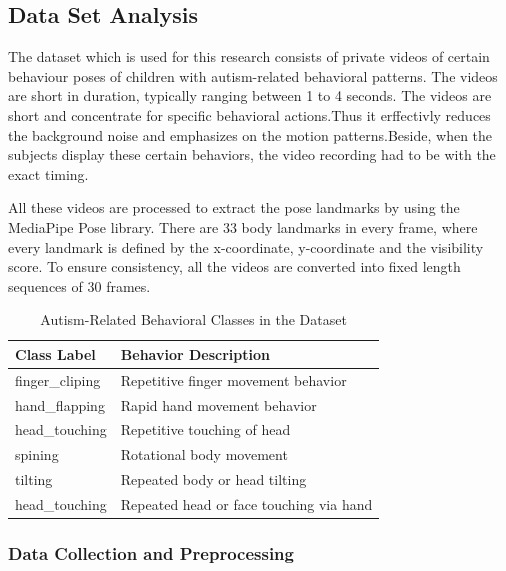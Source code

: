 \subsection{Data Set Analysis}

The dataset which is used for this research consists of private videos of certain behaviour poses of children with autism-related behavioral patterns. The videos are short in duration, typically ranging between 1 to 4 seconds. The videos are short and concentrate for specific behavioral actions.Thus it erffectivly reduces the background noise and emphasizes on the motion patterns.Beside, when the subjects display these certain behaviors, the video recording had to be with the exact timing.

All these videos are processed to extract the pose landmarks by using the MediaPipe Pose library. There are 33 body landmarks in every frame, where every landmark is defined by the x-coordinate, y-coordinate and the visibility score. To ensure consistency, all the videos are converted into fixed length sequences of 30 frames.

\begin{table}[htbp]
\caption{Autism-Related Behavioral Classes in the Dataset}
\begin{center}
\begin{tabularx}{0.6\textwidth}{
| >{\centering\arraybackslash}X
| >{\centering\arraybackslash}X | }
\hline
\textbf{Class Label} & \textbf{Behavior Description} \\
\hline
finger\_cliping & Repetitive finger movement behavior \\
\hline
hand\_flapping & Rapid hand movement behavior \\
\hline
head\_touching & Repetitive touching of head \\
\hline
spining & Rotational body movement \\
\hline
tilting & Repeated body or head tilting \\
\hline
head\_touching & Repeated head or face touching via hand \\
\hline
\end{tabularx}
\label{tab:dataset_classes}
\end{center}
\end{table}

\subsubsection{Data Collection and Preprocessing}

